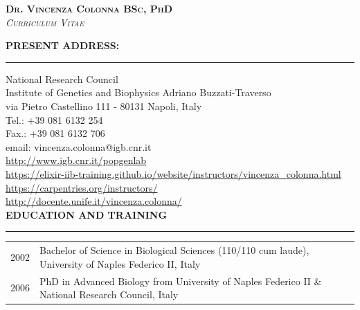 \documentclass[openany]{book}
\begin{document}
\noindent
\begin{center}
\textsc{\textbf{Dr. Vincenza Colonna BSc, PhD}} \\
\textsc{\textit{Curriculum Vitae}} 
\end{center}

\vspace{0.7cm}


\noindent
\MakeUppercase{\textbf{Present address:}} \vspace{0.2cm}
\hrule
\vspace{0.2cm}
\noindent
National Research Council\\
Institute of Genetics and Biophysics Adriano Buzzati-Traverso\\
via Pietro Castellino 111 - 80131 Napoli, Italy\\
Tel.:  +39 081 6132 254\\
Fax.:  +39 081 6132 706\\
email:  vincenza.colonna@igb.cnr.it\\

\vspace{0.1cm}
\noindent
\noindent
\url{http://www.igb.cnr.it/popgenlab}\\
\url{https://elixir-iib-training.github.io/website/instructors/vincenza\_colonna.html}\\
\url{https://carpentries.org/instructors/}\\
\url{http://docente.unife.it/vincenza.colonna/}\\


\vspace{0.4cm}
\noindent
\MakeUppercase{\textbf{Education and training}} 
\vspace{0.2cm}
\hrule
\vspace{0.2cm}
\noindent
\begin{tabular}{ l l }
2002 & Bachelor of Science in Biological Sciences (110/110 cum laude), University of Naples Federico II, Italy\\ 
2006  & PhD in Advanced Biology from University of Naples Federico II \& National Research Council, Italy \\ 
\end{tabular}
\newline 
\end{document}

